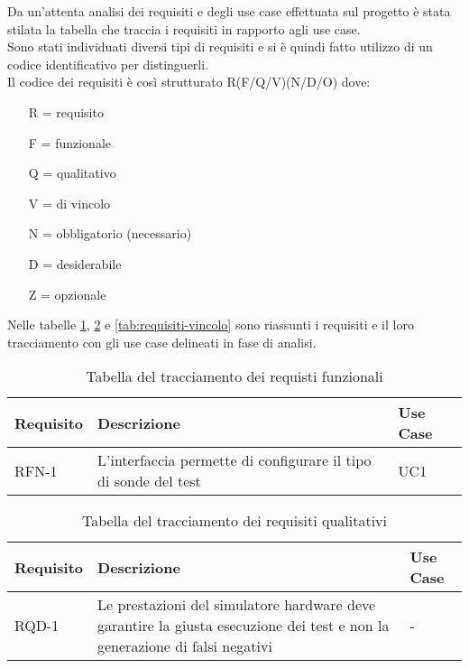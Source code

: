 	Da un'attenta analisi dei requisiti e degli use case effettuata sul progetto è stata stilata la tabella che traccia i requisiti in rapporto agli use case.\\
	Sono stati individuati diversi tipi di requisiti e si è quindi fatto utilizzo di un codice identificativo per distinguerli.\\
	Il codice dei requisiti è così strutturato R(F/Q/V)(N/D/O) dove:
	\begin{enumerate}
		\item[R =] requisito
		\item[F =] funzionale
		\item[Q =] qualitativo
		\item[V =] di vincolo
		\item[N =] obbligatorio (necessario)
		\item[D =] desiderabile
		\item[Z =] opzionale
	\end{enumerate}
	Nelle tabelle \ref{tab:requisiti-funzionali}, \ref{tab:requisiti-qualitativi} e \ref{tab:requisiti-vincolo} sono riassunti i requisiti e il loro tracciamento con gli use case delineati in fase di analisi.
	
	\newpage
	
	\begin{table}%
		\caption{Tabella del tracciamento dei requisti funzionali}
		\label{tab:requisiti-funzionali}
		\begin{tabularx}{\textwidth}{lXl}
			\hline\hline
			\textbf{Requisito} & \textbf{Descrizione} & \textbf{Use Case}\\
			\hline
			RFN-1     & L'interfaccia permette di configurare il tipo di sonde del test & UC1 \\
			\hline
		\end{tabularx}
	\end{table}%
	
	\begin{table}%
		\caption{Tabella del tracciamento dei requisiti qualitativi}
		\label{tab:requisiti-qualitativi}
		\begin{tabularx}{\textwidth}{lXl}
			\hline\hline
			\textbf{Requisito} & \textbf{Descrizione} & \textbf{Use Case}\\
			\hline
			RQD-1    & Le prestazioni del simulatore hardware deve garantire la giusta esecuzione dei test e non la generazione di falsi negativi & - \\
			\hline
		\end{tabularx}
	\end{table}%
	
